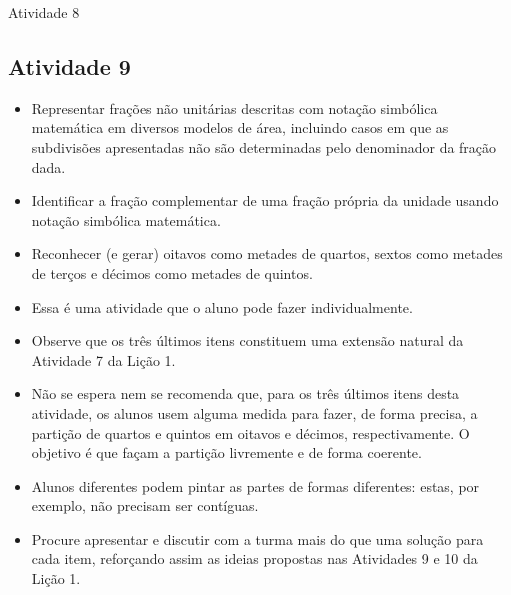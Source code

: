 \documentclass[oneside]{book}
\begin{document}
\begin{multicols}{2}
\begin{resposta*}{Atividade 8}
\end{resposta*}

\subsection{Atividade 9}

   \vspace{.1cm}

  \begin{itemize} %
    \item       Representar frações não unitárias descritas com notação simbólica matemática em diversos modelos de área, incluindo casos em que as subdivisões apresentadas não são determinadas pelo denominador da fração dada.
    \item       Identificar a fração complementar de uma fração própria da unidade usando notação simbólica matemática.
    \item       Reconhecer (e gerar) oitavos como metades de quartos, sextos como metades de terços e décimos como metades de quintos.
\end{itemize} %


  \vspace{.1cm} 
  
  \vspace{.1cm}
  
\begin{itemize} %
    \item       Essa é uma atividade que o aluno pode fazer individualmente.
    \item       Observe que os três últimos itens constituem uma extensão natural da Atividade 7 da Lição 1.
    \item       Não se espera nem se recomenda que, para os três últimos itens desta atividade, os alunos usem alguma medida para fazer, de forma precisa, a partição de quartos e quintos em oitavos e décimos, respectivamente. O objetivo é que façam a partição livremente e de forma coerente.
    \item       Alunos diferentes podem pintar as partes de formas diferentes: estas, por exemplo, não precisam ser contíguas.
    \item       Procure apresentar e discutir com a turma mais do que uma solução para cada item, reforçando assim as ideias propostas nas Atividades 9 e 10 da Lição 1.
\end{itemize} %



\end{multicols}
\end{document}
